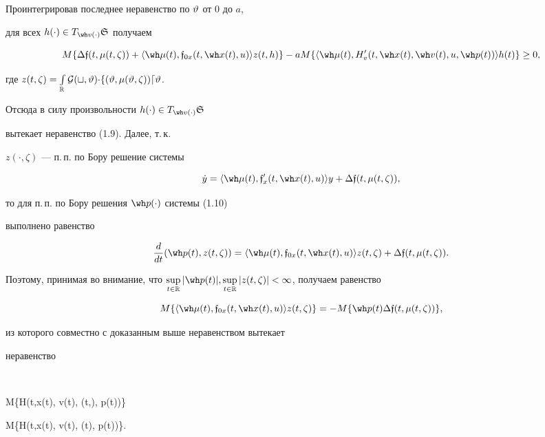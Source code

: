 Проинтегрировав последнее неравенство по $\vartheta$ от 0 до $a$,


для всех $h(\cdot)\in T_{\wh v(\cdot)}\gS$ получаем 


$$


M\{\Dl\frak{f}(t,\mu(t,\zeta))+\la \wh\mu(t),\frak{f}_{0x}(t,\wh x(t),u) \ra


z(t,h)\}-


a M\{\la\wh\mu(t),H_v'(t,\wh x(t),\wh v(t),u,\wh p(t))\ra h(t)\}\ge 0,


$$


где $z(t,\zeta)= \int\limits_{\Bbb R} \cal G(t,\vartheta) \Delta f(\vartheta,\mu(\vartheta,\zeta))d\vartheta$.


Отсюда в силу произвольности $h(\cdot)\in T_{\wh v(\cdot)}\gS$


вытекает неравенство (1.9). Далее, т.\,к.


$z(\cdot,\zeta)$ --- п.\,п. по Бору решение системы


$$


\Dot y=\la \wh\mu(t),


\frak{f}_x'(t,\wh x(t),u) \ra y+\Dl\frak{f}(t,\mu(t,\zeta)),


$$


то для п.\,п. по Бору решения $\wh p(\cdot)$ системы (1.10)


выполнено равенство


$$


\frac{d}{dt} (\wh p(t), z(t,\zeta))=


\la \wh\mu(t), \frak{f}_{0x}(t,\wh x(t),u)


\ra z(t,\zeta)+\Dl\frak{f}(t,\mu(t,\zeta)).


$$


Поэтому, принимая во внимание, что $\sup\lt_{t\in\R} |\wh p(t)|,


\sup\lt_{t\in\R}|z(t,\zeta)|<\infty$, получаем равенство


$$


M\{\la \wh\mu(t), \frak{f}_{0x}(t,\wh x(t),u) \ra z(t,\zeta)\}=


-M\{\wh p(t) \Dl\frak{f}(t,\mu(t,\zeta))\},


$$


из которого совместно с доказанным выше неравенством вытекает


неравенство


$$


M\{\Bbb H(t,\wh x(t), \wh v(t), \mu(t,\zeta), \wh p(t))\}\le


M\{\Bbb H(t,\wh x(t), \wh v(t), \mu(t), \wh p(t))\}.


